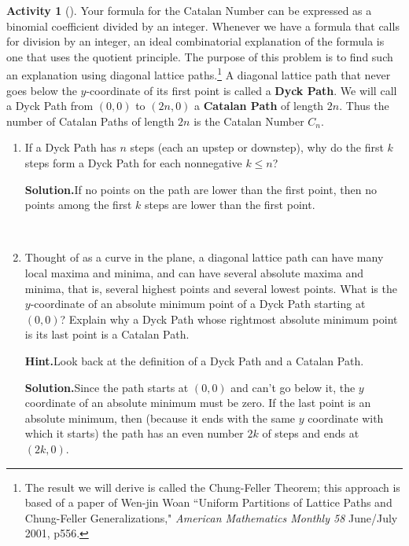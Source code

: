 \documentclass[10pt,]{book}
\newcommand{\terminology}[1]{\textbf{#1}}
\theoremstyle{plain}
\theoremstyle{definition}
\newtheorem{activity}[project]{Activity}
\numberwithin{equation}{chapter}
\begin{document}
\begin{activity}[]\label{activity-52}
Your formula for the Catalan Number can be expressed as a binomial coefficient divided by an integer. Whenever we have a formula that calls for division by an integer, an ideal combinatorial explanation of the formula is one that uses the quotient principle. The purpose of this problem is to find such an explanation using diagonal lattice paths.\footnote{The result we will derive is called the Chung-Feller Theorem; this approach is based of a paper of Wen-jin Woan ``Uniform Partitions of Lattice Paths and Chung-Feller Generalizations," \textsl{American Mathematics Monthly 58} June/July 2001, p556.\label{fn-3}} A diagonal lattice path that never goes below the \(y\)-coordinate of its first point is called a \terminology{Dyck Path}. We will call a Dyck Path from \((0,0)\) to \((2n,0)\) a \terminology{Catalan Path} of length \(2n\). Thus the number of Catalan Paths of length \(2n\) is the Catalan Number \(C_n\).%
~\par
\begin{enumerate}[label=(\alph*)]
 \item If a Dyck Path has \(n\) steps (each an upstep or downstep), why do the first \(k\) steps form a Dyck Path for each nonnegative \(k\le n\)?%
\par\medskip\noindent%
\textbf{Solution.}\quad If no points on the path are lower than the first point, then no points among the first \(k\) steps are lower than the first point.%

~\par
\item Thought of as a curve in the plane, a diagonal lattice path can have many local maxima and minima, and can have several absolute maxima and minima, that is, several highest points and several lowest points. What is the \(y\)-coordinate of an absolute minimum point of a Dyck Path starting at \((0,0)\)?  Explain why a Dyck Path whose rightmost absolute minimum point is its last point is a Catalan Path.%
\par\medskip\noindent%
\textbf{Hint.}\quad Look back at the definition of a Dyck Path and a Catalan Path.%
\par\medskip\noindent%
\textbf{Solution.}\quad Since the path starts at \((0,0)\) and can't go below it, the \(y\) coordinate of an absolute minimum must be zero. If the last point is an absolute minimum, then (because it ends with the same \(y\) coordinate with which it starts) the path has an even number \(2k\) of steps and ends at \((2k,0)\).%


\end{enumerate}
\end{activity}
\end{document}
